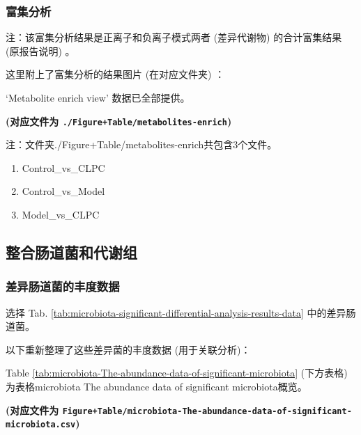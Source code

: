 \documentclass[
]{article}
\providecommand{\tightlist}{%
  \setlength{\itemsep}{0pt}\setlength{\parskip}{0pt}}
\begin{document}
\hypertarget{ux5bccux96c6ux5206ux6790}{%
\subsubsection{富集分析}\label{ux5bccux96c6ux5206ux6790}}

注：该富集分析结果是正离子和负离子模式两者 (差异代谢物) 的合计富集结果 (原报告说明) 。

这里附上了富集分析的结果图片 (在对应文件夹) ：

`Metabolite enrich view' 数据已全部提供。

\textbf{(对应文件为 \texttt{./Figure+Table/metabolites-enrich})}

\begin{center}\begin{tcolorbox}[colback=gray!10, colframe=gray!50, width=0.9\linewidth, arc=1mm, boxrule=0.5pt]注：文件夹./Figure+Table/metabolites-enrich共包含3个文件。

\begin{enumerate}\tightlist
\item Control\_vs\_CLPC
\item Control\_vs\_Model
\item Model\_vs\_CLPC
\end{enumerate}\end{tcolorbox}
\end{center}

\hypertarget{corr}{%
\subsection{整合肠道菌和代谢组}\label{corr}}

\hypertarget{ux5deeux5f02ux80a0ux9053ux83ccux7684ux4e30ux5ea6ux6570ux636e}{%
\subsubsection{差异肠道菌的丰度数据}\label{ux5deeux5f02ux80a0ux9053ux83ccux7684ux4e30ux5ea6ux6570ux636e}}

选择 Tab. \ref{tab:microbiota-significant-differential-analysis-results-data} 中的差异肠道菌。

以下重新整理了这些差异菌的丰度数据 (用于关联分析)：

Table \ref{tab:microbiota-The-abundance-data-of-significant-microbiota} (下方表格) 为表格microbiota The abundance data of significant microbiota概览。

\textbf{(对应文件为 \texttt{Figure+Table/microbiota-The-abundance-data-of-significant-microbiota.csv})}
\end{document}
